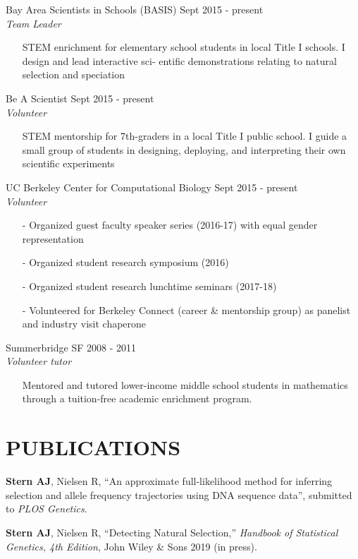 \documentclass[margin, 10pt]{res} %
\begin{document}
\begin{resume}
Bay Area Scientists in Schools (BASIS) \hfill Sept 2015 - present\\
{\sl Team Leader}
\begin{itemize}
\item[] STEM enrichment for elementary school students in local Title I schools. I design and lead interactive sci- entific demonstrations relating to natural selection and speciation
\end{itemize} 
Be A Scientist \hfill Sept 2015 - present\\
{\sl Volunteer}
\begin{itemize}
\item[] STEM mentorship for 7th-graders in a local Title I public school. I guide a small group of students in designing, deploying, and interpreting their own scientific experiments
\end{itemize} 
UC Berkeley Center for Computational Biology \hfill Sept 2015 - present\\
{\sl Volunteer}
\begin{itemize}
\item[-] Organized guest faculty speaker series (2016-17) with equal gender representation
\item[-] Organized student research symposium (2016)
\item[-] Organized student research lunchtime seminars (2017-18)
\item[-] Volunteered for Berkeley Connect (career \& mentorship group) as panelist and industry visit chaperone
\end{itemize}
Summerbridge SF \hfill 2008 - 2011\\
{\sl Volunteer tutor}
\begin{itemize}
\item[] Mentored and tutored lower-income middle school students in mathematics through a tuition-free academic enrichment program.
\end{itemize}

\section{PUBLICATIONS}

{\bf Stern AJ}, Nielsen R, ``An approximate full-likelihood method for inferring selection and allele frequency trajectories using DNA sequence data'', submitted to {\it PLOS Genetics}. 

{\bf Stern AJ}, Nielsen R, ``Detecting Natural Selection,'' {\it Handbook of Statistical Genetics, 4th Edition},  John Wiley \& Sons 2019 (in press).


\end{resume}
\end{document}
